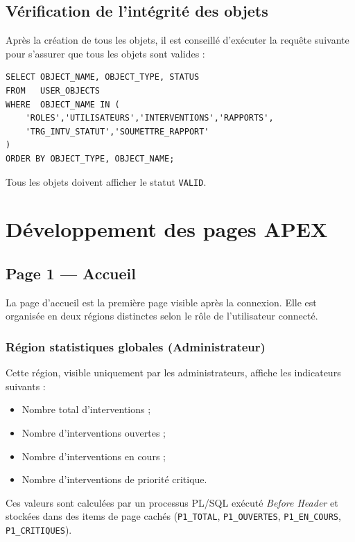 \documentclass[12pt,a4paper,oneside]{report}
\begin{document}
\subsection{Vérification de l'intégrité des objets}

Après la création de tous les objets, il est conseillé d'exécuter la requête suivante pour s'assurer que tous les objets sont valides :

\begin{lstlisting}[language=PLSQL, caption=Requête de vérification de l'intégrité]
SELECT OBJECT_NAME, OBJECT_TYPE, STATUS
FROM   USER_OBJECTS
WHERE  OBJECT_NAME IN (
    'ROLES','UTILISATEURS','INTERVENTIONS','RAPPORTS',
    'TRG_INTV_STATUT','SOUMETTRE_RAPPORT'
)
ORDER BY OBJECT_TYPE, OBJECT_NAME;
\end{lstlisting}

Tous les objets doivent afficher le statut \texttt{VALID}.

\section{Développement des pages APEX}

\subsection{Page 1 — Accueil}

La page d'accueil est la première page visible après la connexion. Elle est organisée en deux régions distinctes selon le rôle de l'utilisateur connecté.

\subsubsection{Région statistiques globales (Administrateur)}

Cette région, visible uniquement par les administrateurs, affiche les indicateurs suivants :
\begin{itemize}[leftmargin=2em]
  \item Nombre total d'interventions ;
  \item Nombre d'interventions ouvertes ;
  \item Nombre d'interventions en cours ;
  \item Nombre d'interventions de priorité critique.
\end{itemize}

Ces valeurs sont calculées par un processus PL/SQL exécuté \textit{Before Header} et stockées dans des items de page cachés (\texttt{P1\_TOTAL}, \texttt{P1\_OUVERTES}, \texttt{P1\_EN\_COURS}, \texttt{P1\_CRITIQUES}).
\end{document}
